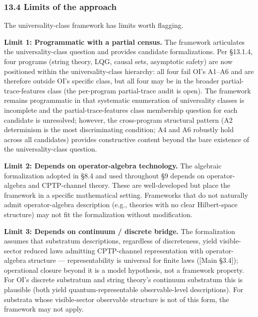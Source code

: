 \documentclass[
]{article}
\begin{document}
\hypertarget{limits-of-the-approach}{%
\subsubsection{13.4 Limits of the
approach}\label{limits-of-the-approach}}

The universality-class framework has limits worth flagging.

\textbf{Limit 1: Programmatic with a partial census.} The framework
articulates the universality-class question and provides candidate
formalizations. Per §13.1.4, four programs (string theory, LQG, causal
sets, asymptotic safety) are now positioned within the
universality-class hierarchy: all four fail OI's A1--A6 and are
therefore outside OI's specific class, but all four may be in the
broader partial-trace-features class (the per-program partial-trace
audit is open). The framework remains programmatic in that systematic
enumeration of universality classes is incomplete and the
partial-trace-features class membership question for each candidate is
unresolved; however, the cross-program structural pattern (A2
determinism is the most discriminating condition; A4 and A6 robustly
hold across all candidates) provides constructive content beyond the
bare existence of the universality-class question.

\textbf{Limit 2: Depends on operator-algebra technology.} The algebraic
formalization adopted in §8.4 and used throughout §9 depends on
operator-algebra and CPTP-channel theory. These are well-developed but
place the framework in a specific mathematical setting. Frameworks that
do not naturally admit operator-algebra description (e.g., theories with
no clear Hilbert-space structure) may not fit the formalization without
modification.

\textbf{Limit 3: Depends on continuum / discrete bridge.} The
formalization assumes that substratum descriptions, regardless of
discreteness, yield visible-sector reduced laws admitting CPTP-channel
representation with operator-algebra structure --- representability is
universal for finite laws ({[}Main §3.4{]}); operational closure beyond
it is a model hypothesis, not a framework property. For OI's discrete
substratum and string theory's continuum substratum this is plausible
(both yield quantum-representable observable-level descriptions). For
substrata whose visible-sector observable structure is not of this form,
the framework may not apply.
\end{document}
